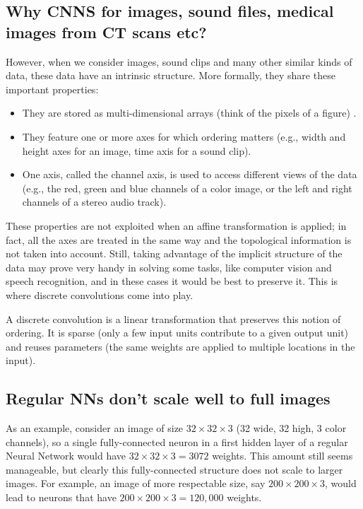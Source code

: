 \documentclass[%
oneside,                 %
final,                   %
10pt]{article}
\begin{document}
\subsection{Why CNNS for images, sound files, medical images from CT scans etc?}

However, when we consider images, sound clips and many other similar kinds of data, these data  have an intrinsic
structure. More formally, they share these important properties:
\begin{itemize}
\item They are stored as multi-dimensional arrays (think of the pixels of a figure) .

\item They feature one or more axes for which ordering matters (e.g., width and height axes for an image, time axis for a sound clip).

\item One axis, called the channel axis, is used to access different views of the data (e.g., the red, green and blue channels of a color image, or the left and right channels of a stereo audio track).
\end{itemize}

\noindent
These properties are not exploited when an affine transformation is applied; in
fact, all the axes are treated in the same way and the topological information
is not taken into account. Still, taking advantage of the implicit structure of
the data may prove very handy in solving some tasks, like computer vision and
speech recognition, and in these cases it would be best to preserve it. This is
where discrete convolutions come into play.

A discrete convolution is a linear transformation that preserves this notion of
ordering. It is sparse (only a few input units contribute to a given output
unit) and reuses parameters (the same weights are applied to multiple locations
in the input).

\subsection{Regular NNs don’t scale well to full images}

As an example, consider
an image of size $32\times 32\times 3$ (32 wide, 32 high, 3 color channels), so a
single fully-connected neuron in a first hidden layer of a regular
Neural Network would have $32\times 32\times 3 = 3072$ weights. This amount still
seems manageable, but clearly this fully-connected structure does not
scale to larger images. For example, an image of more respectable
size, say $200\times 200\times 3$, would lead to neurons that have 
$200\times 200\times 3 = 120,000$ weights. 
\end{document}
